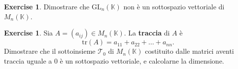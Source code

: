 \documentclass{article}
\theoremstyle{plain}
\theoremstyle{definition}
\newtheorem{xca}[exmp]{Exercise}
\theoremstyle{remark}
\begin{document}
\vspace{10pt}

\begin{bxthm}
\begin{xca}
    Dimostrare che $\mathrm{GL}_n(\mathbb{K})$ non è un sottospazio vettoriale di $M_n(\mathbb{K})$.
\end{xca}
\end{bxthm}

\vspace{10pt}

\begin{bxthm}
\begin{xca}
    Sia $A=(a_{ij})\in M_n(\mathbb{K})$. La \textbf{traccia} di $A$ è
    \[
    \mathrm{tr}(A)=a_{11}+a_{22}+\dots+a_{nn}.
    \]
    Dimostrare che il sottoinsieme $\mathcal{T}_0$ di $M_n(\mathbb{K})$ costituito dalle matrici aventi traccia uguale a 0 è un sottospazio vettoriale, e calcolarne la dimensione.
\end{xca}
\end{bxthm}
\end{document}
